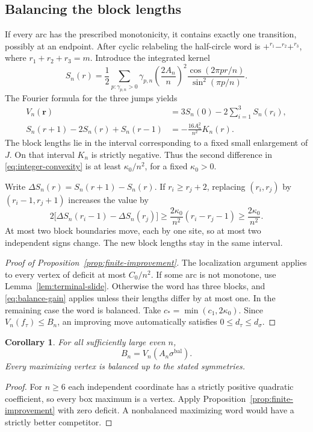 \documentclass[11pt,reqno]{amsart}
\numberwithin{equation}{section}
\newtheorem{corollary}[theorem]{Corollary}
\theoremstyle{definition}
\theoremstyle{remark}
\newcommand{\bal}{\mathrm{bal}}
\begin{document}
\subsection{Balancing the block lengths}
If every arc has the prescribed monotonicity, it contains exactly one transition, possibly at an endpoint. After cyclic relabeling the half-circle word is $+^{r_1}-^{r_2}+^{r_3}$, where $r_1+r_2+r_3=m$. Introduce the integrated kernel
\begin{equation}\label{eq:integrated-kernel}
 S_n(r)=\frac12\sum_{p:\gamma_{p,n}>0}\gamma_{p,n}
 \left(\frac{2A_n}{n}\right)^2
 \frac{\cos(2\pi pr/n)}{\sin^2(\pi p/n)}.
\end{equation}
The Fourier formula for the three jumps yields
\begin{align}
 V_n(\mathbf r)&=3S_n(0)-2\sum_{i=1}^3 S_n(r_i),
       \label{eq:three-block-value}\\
 S_n(r+1)-2S_n(r)+S_n(r-1)&=-\frac{16A_n^2}{n^2}K_n(r).
       \label{eq:integer-convexity}
\end{align}
The block lengths lie in the interval corresponding to a fixed small enlargement of $J$. On that interval $K_n$ is strictly negative. Thus the second difference in \eqref{eq:integer-convexity} is at least $\kappa_0/n^2$, for a fixed $\kappa_0>0$.

Write $\Delta S_n(r)=S_n(r+1)-S_n(r)$. If $r_i\ge r_j+2$, replacing $(r_i,r_j)$ by $(r_i-1,r_j+1)$ increases the value by
\begin{equation}\label{eq:balance-gain}
 2\bigl[\Delta S_n(r_i-1)-\Delta S_n(r_j)\bigr]
 \ge\frac{2\kappa_0}{n^2}(r_i-r_j-1)
 \ge\frac{2\kappa_0}{n^2}.
\end{equation}
At most two block boundaries move, each by one site, so at most two independent signs change. The new block lengths stay in the same interval.

\begin{proof}[Proof of Proposition~\ref{prop:finite-improvement}]
The localization argument applies to every vertex of deficit at most $C_0/n^2$. If some arc is not monotone, use Lemma~\ref{lem:terminal-slide}. Otherwise the word has three blocks, and \eqref{eq:balance-gain} applies unless their lengths differ by at most one. In the remaining case the word is balanced. Take $c_*=\min(c_1,2\kappa_0)$. Since $V_n(f_\tau)\le B_n$, an improving move automatically satisfies $0\le d_\tau\le d_\sigma$.
\end{proof}

\begin{corollary}\label{cor:model-maximum}
For all sufficiently large even $n$,
\begin{equation}\label{eq:model-exact}
 B_n=V_n(A_n\sigma^{\bal}).
\end{equation}
Every maximizing vertex is balanced up to the stated symmetries.
\end{corollary}
\begin{proof}
For $n\ge6$ each independent coordinate has a strictly positive quadratic coefficient, so every box maximum is a vertex. Apply Proposition~\ref{prop:finite-improvement} with zero deficit. A nonbalanced maximizing word would have a strictly better competitor.
\end{proof}
\end{document}
